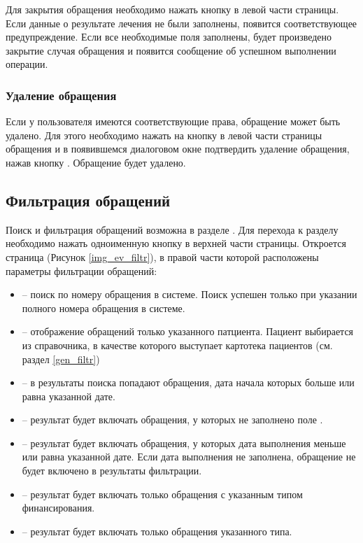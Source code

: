 Для закрытия обращения необходимо нажать кнопку  в левой части страницы. Если данные о результате лечения не были заполнены, появится соответствующее предупреждение. Если все необходимые поля заполнены, будет произведено закрытие случая обращения и появится сообщение об успешном выполнении операции.

\subsubsection{Удаление обращения}

Если у пользователя имеются соответствующие права, обращение может быть удалено. Для этого необходимо нажать на кнопку  в левой части страницы обращения и в появившемся диалоговом окне подтвердить удаление обращения, нажав кнопку . Обращение будет удалено.

\subsection{Фильтрация обращений} \label{ev_obr_filtr}

Поиск и фильтрация обращений возможна в разделе . Для перехода к разделу необходимо нажать одноименную кнопку в верхней части страницы. Откроется страница (Рисунок \ref{img_ev_filtr}), в правой части которой расположены параметры фильтрации обращений: 

\begin{itemize}
 \item {} -- поиск по номеру обращения в системе. Поиск успешен только при указании полного номера обращения в системе.
 \item {} -- отображение обращений только указанного патциента. Пациент выбирается из справочника, в качестве которого выступает картотека пациентов (см. раздел \ref{gen_filtr})
 \item {} -- в результаты поиска попадают обращения, дата начала которых больше или равна указанной дате.
 \item {} -- результат будет включать обращения, у которых не заполнено поле .
 \item {} -- результат будет включать обращения, у которых дата выполнения меньше или равна указанной дате. Если дата выполнения не заполнена, обращение не будет включено в результаты фильтрации.
 \item {} – результат будет включать только обращения с указанным типом финансирования.
 \item {} – результат будет включать только обращения указанного типа.
\end{itemize}

